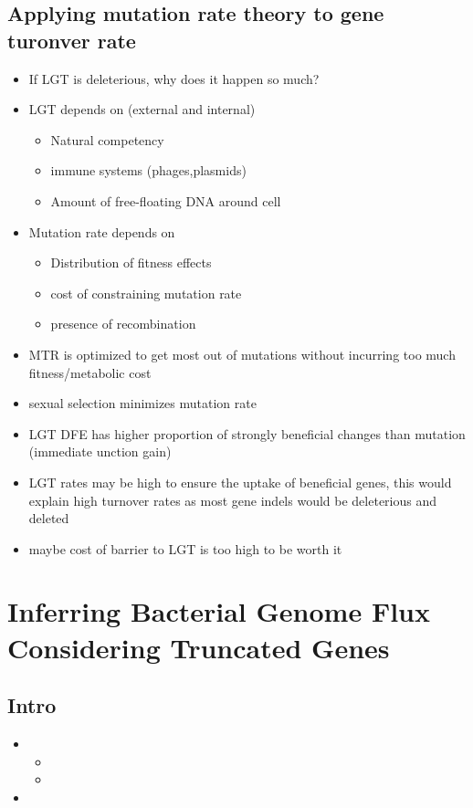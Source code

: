 \documentclass[10pt,letter]{article}
\begin{document}
\subsection*{Applying mutation rate theory to gene turonver rate}
\begin{itemize}
    \item If LGT is deleterious, why does it happen so much?
    \item LGT depends on (external and internal)
    \begin{itemize}
        \item Natural competency
        \item immune systems (phages,plasmids)
        \item Amount of free-floating DNA around cell
    \end{itemize}
    \item Mutation rate depends on
    \begin{itemize}
        \item Distribution of fitness effects
        \item cost of constraining mutation rate
        \item presence of recombination
    \end{itemize}
    \item MTR is optimized to get most out of mutations without incurring too much fitness/metabolic cost
    \item sexual selection minimizes mutation rate
    \item LGT DFE has higher proportion of strongly beneficial changes than mutation (immediate unction gain)
    \item LGT rates may be high to ensure the uptake of beneficial genes, this would explain high turnover rates as most gene indels would be deleterious and deleted
    \item maybe cost of barrier to LGT is too high to be worth it
\end{itemize}
\section*{Inferring Bacterial Genome Flux Considering Truncated Genes\cite{fluxt}}
\subsection*{Intro}
\begin{itemize}
    \item
    \begin{itemize}
        \item
        \item
    \end{itemize}
    \item
\end{itemize}
\end{document}
